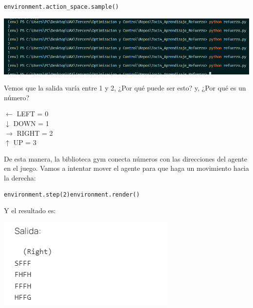 \documentclass{article}
\begin{document}
\vspace{0.5cm}

\begin{lstlisting}[style=mystyle]
    environment.action_space.sample()

\end{lstlisting}

\vspace{0.5cm}

\begin{center}
    \includegraphics[width=0.75\linewidth]{image.png}
    
\end{center}

\vspace{0.5cm}

Vemos que la salida varía entre 1 y 2, ¿Por qué puede ser esto? y, ¿Por qué es un número?

\vspace{0.5cm}

\begin{center}
$\leftarrow$ LEFT = 0 \\
$\downarrow$ DOWN = 1 \\
$\rightarrow$ RIGHT = 2 \\
$\uparrow$ UP = 3
\end{center}

\vspace{0.5cm}

De esta manera, la biblioteca gym conecta números con las direcciones del agente en el juego. Vamos a intentar mover el agente para que haga un movimiento hacia la derecha:

\vspace{0.5cm}

\begin{lstlisting}[style=mystyle]
    environment.step(2)environment.render()

\end{lstlisting}

\vspace{0.5cm}

Y el resultado es:

\vspace{0.5cm}

\begin{center}
    \includegraphics[width=0.75\linewidth]{mov_der.png}
\end{center}
\end{document}
